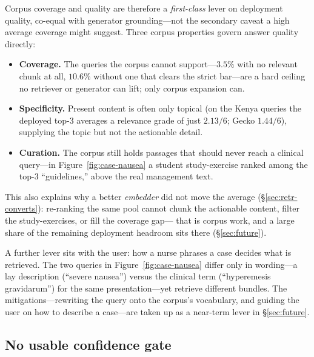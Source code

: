 Corpus coverage and quality are therefore a \emph{first-class} lever on
deployment quality, co-equal with generator grounding---not the secondary
caveat a high average coverage might suggest. Three corpus properties govern
answer quality directly:
\begin{itemize}\setlength{\itemsep}{1pt}
  \item \textbf{Coverage.} The queries the corpus cannot support---$3.5\%$
  with no relevant chunk at all, $10.6\%$ without one that clears the strict
  bar---are a hard ceiling no retriever or generator can lift; only corpus
  expansion can.
  \item \textbf{Specificity.} Present content is often only topical (on the
  Kenya queries the deployed top-3 averages a relevance grade of just
  $2.13/6$; Gecko $1.44/6$), supplying the topic but not the actionable
  detail.
  \item \textbf{Curation.} The corpus still holds passages that should never
  reach a clinical query---in Figure~\ref{fig:case-nausea} a student
  study-exercise ranked among the top-3 ``guidelines,'' above the real
  management text.
\end{itemize}
This also explains why a better \emph{embedder} did not move the average
(\S\ref{sec:retr-converts}): re-ranking the same pool cannot chunk the
actionable content, filter the study-exercises, or fill the coverage gap---%
that is corpus work, and a large share of the remaining deployment headroom
sits there (\S\ref{sec:future}).

A further lever sits with the user: how a nurse phrases a case decides what is
retrieved. The two queries in Figure~\ref{fig:case-nausea} differ only in
wording---a lay description (``severe nausea'') versus the clinical term
(``hyperemesis gravidarum'') for the same presentation---yet retrieve
different bundles. The mitigations---rewriting the query onto the corpus's
vocabulary, and guiding the user on how to describe a case---are taken up as a
near-term lever in \S\ref{sec:future}.

\subsection{No usable confidence gate}
\label{sec:retr-gate}

